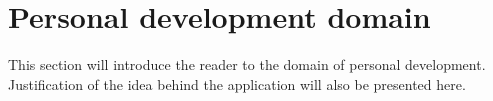 
\chapter{Personal development domain}\label{ch:personal-development-domain}

This section will introduce the reader to the domain of personal development.
Justification of the idea behind the application will also be presented here.





